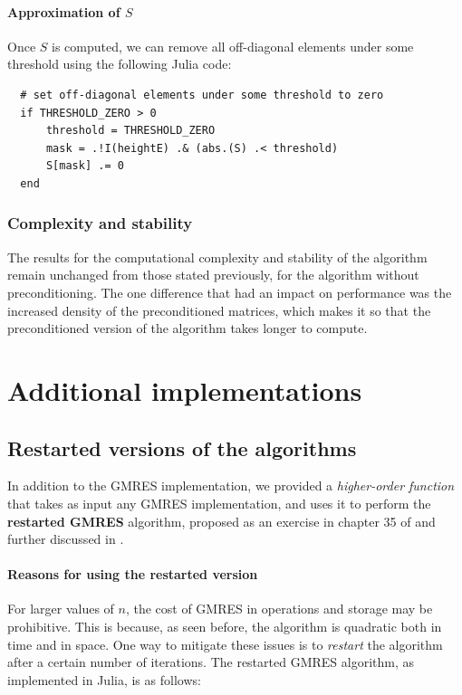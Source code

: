 \documentclass{article}
\begin{document}
\paragraph{Approximation of $S$} Once $S$ is computed, we can remove all off-diagonal elements under some threshold using the following Julia code:
\begin{lstlisting}
  # set off-diagonal elements under some threshold to zero
  if THRESHOLD_ZERO > 0
      threshold = THRESHOLD_ZERO
      mask = .!I(heightE) .& (abs.(S) .< threshold)
      S[mask] .= 0
  end
\end{lstlisting}
\subsubsection{Complexity and stability}

The results for the computational complexity and stability of the algorithm remain unchanged from those stated previously, for the algorithm without preconditioning. The one difference that had an impact on performance was the increased density of the preconditioned matrices, which makes it so that the preconditioned version of the algorithm takes longer to compute.

\newpage

\section{Additional implementations}

\subsection{Restarted versions of the algorithms}

In addition to the GMRES implementation, we provided a \emph{higher-order function} that takes as input any GMRES implementation, and uses it to perform the \textbf{restarted GMRES} algorithm, proposed as an exercise in chapter 35 of \cite{trefethen2022numerical} and further discussed in \cite{saad2003iterative}.

\paragraph{Reasons for using the restarted version}

For larger values of $n$, the cost of GMRES in operations and storage may be prohibitive. This is because, as seen before, the algorithm is quadratic both in time and in space. One way to mitigate these issues is to \emph{restart} the algorithm after a certain number of iterations. The restarted GMRES algorithm, as implemented in Julia, is as follows:
\end{document}
